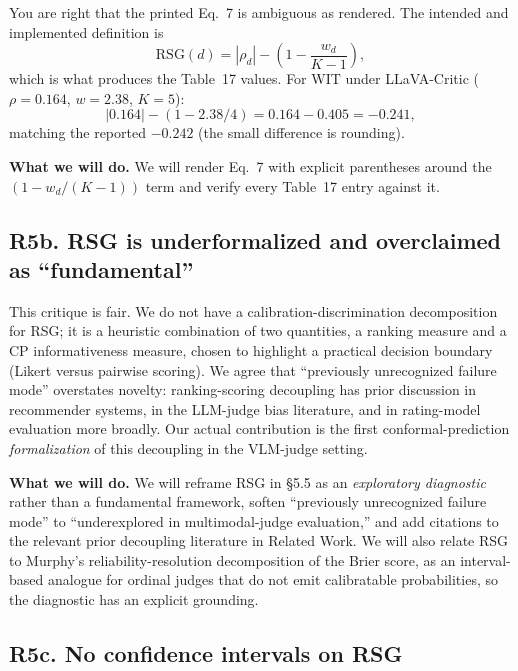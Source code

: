 \documentclass[11pt]{article}
\begin{document}
You are right that the printed Eq.~7 is ambiguous as rendered. The intended and implemented definition is
$$\text{RSG}(d) = |\rho_d| - \left(1 - \frac{w_d}{K-1}\right),$$
which is what produces the Table~17 values. For WIT under LLaVA-Critic ($\rho = 0.164$, $w = 2.38$, $K = 5$):
$$|0.164| - \left(1 - 2.38/4\right) = 0.164 - 0.405 = -0.241,$$
matching the reported $-0.242$ (the small difference is rounding).

\textbf{What we will do.} We will render Eq.~7 with explicit parentheses around the $\left(1 - w_d/(K-1)\right)$ term and verify every Table~17 entry against it.

\subsection*{R5b. RSG is underformalized and overclaimed as ``fundamental''}

This critique is fair. We do not have a calibration-discrimination decomposition for RSG; it is a heuristic combination of two quantities, a ranking measure and a CP informativeness measure, chosen to highlight a practical decision boundary (Likert versus pairwise scoring). We agree that ``previously unrecognized failure mode'' overstates novelty: ranking-scoring decoupling has prior discussion in recommender systems, in the LLM-judge bias literature, and in rating-model evaluation more broadly. Our actual contribution is the first conformal-prediction \emph{formalization} of this decoupling in the VLM-judge setting.

\textbf{What we will do.} We will reframe RSG in \S 5.5 as an \emph{exploratory diagnostic} rather than a fundamental framework, soften ``previously unrecognized failure mode'' to ``underexplored in multimodal-judge evaluation,'' and add citations to the relevant prior decoupling literature in Related Work. We will also relate RSG to Murphy's reliability-resolution decomposition of the Brier score, as an interval-based analogue for ordinal judges that do not emit calibratable probabilities, so the diagnostic has an explicit grounding.

\subsection*{R5c. No confidence intervals on RSG}
\end{document}
